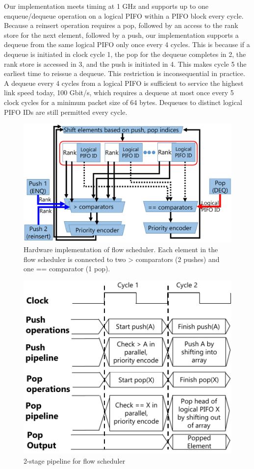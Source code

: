 Our implementation meets timing at 1 GHz and supports up to one enqueue/dequeue
operation on a logical PIFO within a PIFO block every cycle. Because a reinsert
operation requires a pop, followed by an access to the rank store for the next
element, followed by a push, our implementation supports a dequeue from the
same logical PIFO only once every 4 cycles. This is because if a dequeue is
initiated in clock cycle 1, the pop for the dequeue completes in 2, the rank
store is accessed in 3, and the push is initiated in 4. This makes cycle 5 the
earliest time to reissue a dequeue.  This restriction is inconsequential in
practice.  A dequeue every 4 cycles from a logical PIFO is sufficient to
service the highest link speed today, 100 Gbit/s, which requires a dequeue at
most once every 5 clock cycles for a minimum packet size of 64 bytes. Dequeues
to distinct logical PIFO IDs are still permitted every cycle.

\begin{figure}[!t]
  \centering
  \includegraphics[width=0.6\columnwidth]{pifo_flow_scheduler_hardware.pdf}
  \caption{Hardware implementation of flow scheduler. Each element in the flow
  scheduler is connected to two > comparators (2 pushes) and one == comparator (1
  pop).}
  \label{fig:flow_scheduler}
\end{figure}

\begin{figure}[!t]
  \centering
  \includegraphics[width=0.6\columnwidth]{pifo_2stage_pipeline.pdf}
  \caption{2-stage pipeline for flow scheduler}
  \label{fig:2stage}
\end{figure}

